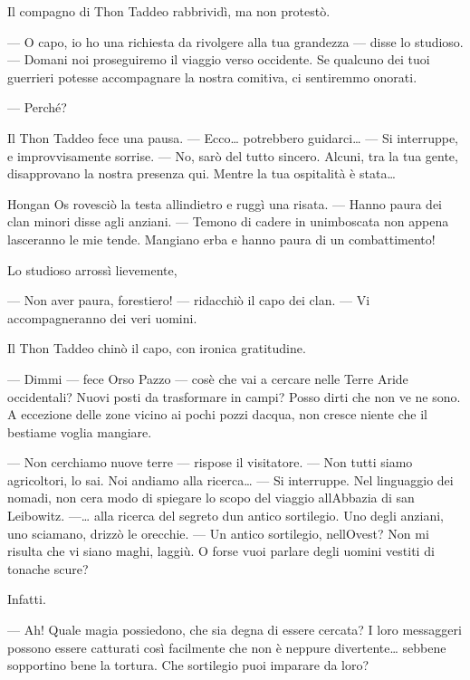 Il compagno di Thon Taddeo rabbrividì, ma non protestò.

--- O capo, io ho una richiesta da rivolgere alla tua grandezza ---
disse lo studioso. --- Domani noi proseguiremo il viaggio verso
occidente. Se qualcuno dei tuoi guerrieri potesse accompagnare la nostra
comitiva, ci sentiremmo onorati.

--- Perché?

Il Thon Taddeo fece una pausa. --- Ecco\ldots{} potrebbero
guidarci\ldots{} --- Si interruppe, e improvvisamente sorrise. --- No,
sarò del tutto sincero. Alcuni, tra la tua gente, disapprovano la nostra
presenza qui. Mentre la tua ospitalità è stata\ldots{}

Hongan Os rovesciò la testa all\textquotesingle indietro e ruggì una
risata. --- Hanno paura dei clan minori disse agli anziani. --- Temono
di cadere in un\textquotesingle imboscata non appena lasceranno le mie
tende. Mangiano erba e hanno paura di un combattimento!

Lo studioso arrossì lievemente,

--- Non aver paura, forestiero! --- ridacchiò il capo dei clan. --- Vi
accompagneranno dei veri uomini.

Il Thon Taddeo chinò il capo, con ironica gratitudine.

--- Dimmi --- fece Orso Pazzo --- cos\textquotesingle è che vai a
cercare nelle Terre Aride occidentali? Nuovi posti da trasformare in
campi? Posso dirti che non ve ne sono. A eccezione delle zone vicino ai
pochi pozzi d\textquotesingle acqua, non cresce niente che il bestiame
voglia mangiare.

--- Non cerchiamo nuove terre --- rispose il visitatore. --- Non tutti
siamo agricoltori, lo sai. Noi andiamo alla ricerca\ldots{} --- Si
interruppe. Nel linguaggio dei nomadi, non c\textquotesingle era modo di
spiegare lo scopo del viaggio all\textquotesingle Abbazia di san
Leibowitz. ---\ldots{} alla ricerca del segreto d\textquotesingle un
antico sortilegio. Uno degli anziani, uno sciamano, drizzò le orecchie.
--- Un antico sortilegio, nell\textquotesingle Ovest? Non mi risulta che
vi siano maghi, laggiù. O forse vuoi parlare degli uomini vestiti di
tonache scure?

Infatti.

--- Ah! Quale magia possiedono, che sia degna di essere cercata? I loro
messaggeri possono essere catturati così facilmente che non è neppure
divertente\ldots{} sebbene sopportino bene la tortura. Che sortilegio
puoi imparare da loro?

